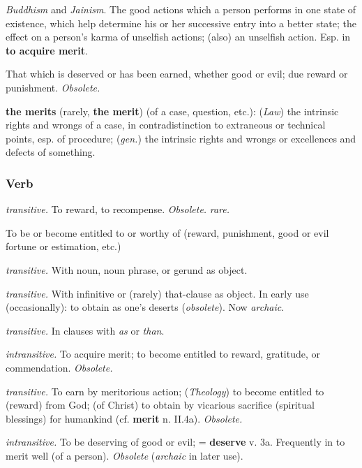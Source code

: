 \begin{compactitem}
			\item[II.4.d] \textit{Buddhism} and \textit{Jainism}. The good actions which a person performs in one state of existence, which help determine his or her successive entry into a better state; the effect on a person's karma of unselfish actions; (also) an unselfish action. Esp. in \textbf{to acquire merit}.
			\item[II.5] That which is deserved or has been earned, whether good or evil; due reward or punishment. \textit{Obsolete.}
			\item[II.6] \textbf{the merits} (rarely, \textbf{the merit}) (of a case, question, etc.): (\textit{Law}) the intrinsic rights and wrongs of a case, in contradistinction to extraneous or technical points, esp. of procedure; (\textit{gen.}) the intrinsic rights and wrongs or excellences and defects of something.
		\end{compactitem}
		
	\subsubsection{Verb}
	
		\begin{compactitem}
			\item[1] \textit{transitive.} To reward, to recompense. \textit{Obsolete.} \textit{rare.}
			\item[2] To be or become entitled to or worthy of (reward, punishment, good or evil fortune or estimation, etc.)
			\item[2.a] \textit{transitive.} With noun, noun phrase, or gerund as object.
			\item[2.b] \textit{transitive.} With infinitive or (rarely) that-clause as object. In early use (occasionally): to obtain as one's deserts (\textit{obsolete}). Now \textit{archaic}.
			\item[2.c] \textit{transitive.} In clauses with \textit{as} or \textit{than}.
			\item[3] \textit{intransitive.} To acquire merit; to become entitled to reward, gratitude, or commendation. \textit{Obsolete.}
			\item[4] \textit{transitive.} To earn by meritorious action; (\textit{Theology}) to become entitled to (reward) from God; (of Christ) to obtain by vicarious sacrifice (spiritual blessings) for humankind (cf. \textbf{merit} n. II.4a). \textit{Obsolete.}
			\item[5] \textit{intransitive.} To be deserving of good or evil; = \textbf{deserve} v. 3a. Frequently in to merit well (of a person). \textit{Obsolete} (\textit{archaic} in later use).
		\end{compactitem}
	
